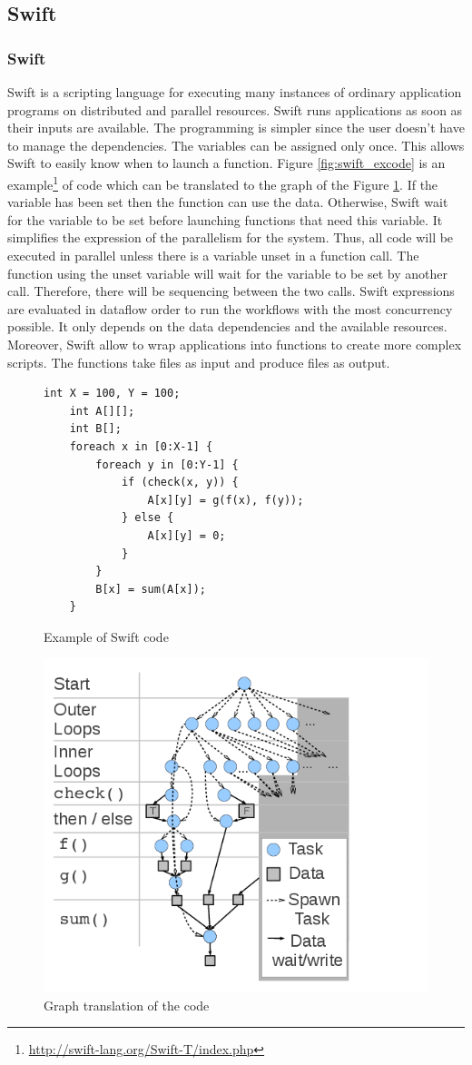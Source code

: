 \subsection{Swift}
\subsubsection{Swift}
Swift \cite{ZHCFL2007} \cite{WHWCK2011} is a scripting language for executing many instances of ordinary application programs on distributed and parallel resources.
Swift runs applications as soon as their inputs are available.
The programming is simpler since the user doesn't have to manage the dependencies.
The variables can be assigned only once.
This allows Swift to easily know when to launch a function.
Figure \ref{fig:swift_excode} is an example\footnote{\url{http://swift-lang.org/Swift-T/index.php}} of code which can be translated to the graph of the Figure \ref{fig:swift_exgraph}.
If the variable has been set then the function can use the data.
Otherwise, Swift wait for the variable to be set before launching functions that need this variable.
It simplifies the expression of the parallelism for the system.
Thus, all code will be executed in parallel unless there is a variable unset in a function call.
The function using the unset variable will wait for the variable to be set by another call.
Therefore, there will be sequencing between the two calls.
Swift expressions are evaluated in dataflow order to run the workflows with the most concurrency possible.
It only depends on the data dependencies and the available resources.
Moreover, Swift allow to wrap applications into functions to create more complex scripts.
The functions take files as input and produce files as output.

\begin{figure}[H]
\begin{multicols}{2}
	\begin{lstlisting}[basicstyle=\ttfamily, tabsize=3, frame=single]
	int X = 100, Y = 100;
	int A[][];
	int B[];
	foreach x in [0:X-1] {
		foreach y in [0:Y-1] {
			if (check(x, y)) {
				A[x][y] = g(f(x), f(y));
			} else {
				A[x][y] = 0;
			}
		}
		B[x] = sum(A[x]);
	}
	\end{lstlisting}
	\caption{Example of Swift code \label{fig:swift_excode}}
	\centering
	\includegraphics[width=.45\textwidth]{swift_spawngraph}
	\caption{Graph translation of the code\label{fig:swift_exgraph}}
\end{multicols}
\end{figure}

